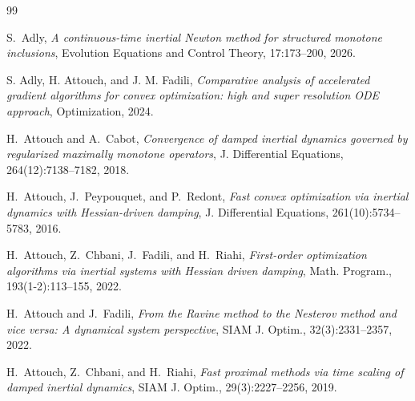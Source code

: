\documentclass[11pt]{article}
\numberwithin{equation}{section}
\begin{document}
\begin{thebibliography}{99} 

S.~Adly,
\textit{A continuous-time inertial Newton method for structured monotone inclusions},
Evolution Equations and Control Theory, 17:173--200, 2026.

S. Adly, H. Attouch, and J. M. Fadili,
\textit{Comparative analysis of accelerated gradient algorithms for convex optimization: high and super resolution ODE approach}, Optimization, 2024. 



H.~Attouch and A.~Cabot, \textit{Convergence of damped inertial dynamics governed by regularized maximally monotone operators}, J. Differential Equations, 264(12):7138--7182, 2018.

H.~Attouch, J.~Peypouquet, and P.~Redont, \textit{Fast convex optimization via inertial dynamics with Hessian-driven damping}, J. Differential Equations, 261(10):5734--5783, 2016.

H.~Attouch, Z.~Chbani, J.~Fadili, and H.~Riahi, \textit{First-order optimization algorithms via inertial systems with Hessian driven damping}, Math. Program., 193(1-2):113--155, 2022. 

H.~Attouch and J.~Fadili, \textit{From the Ravine method to the Nesterov method and vice versa: A dynamical system perspective}, SIAM J. Optim., 32(3):2331--2357, 2022.

H.~Attouch, Z.~Chbani, and H.~Riahi, \textit{Fast proximal methods via time scaling of damped inertial dynamics}, SIAM J. Optim., 29(3):2227--2256, 2019.





\end{thebibliography}
\end{document}
